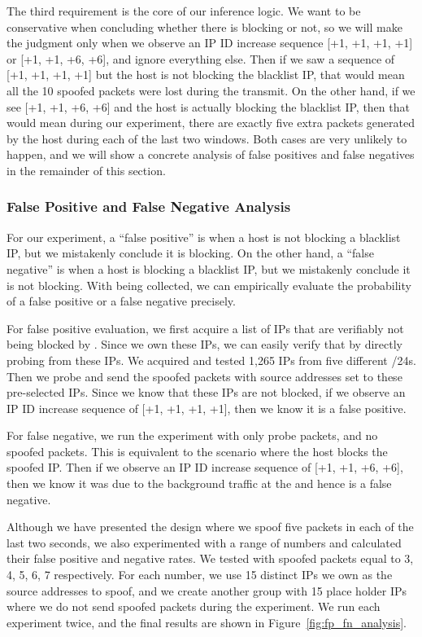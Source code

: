 The third requirement is the core of our inference logic. We want to be
conservative when concluding whether there is blocking or not, so we will
make the judgment only when we observe an IP ID increase sequence [+1, +1, +1,
+1] or [+1, +1, +6, +6], and ignore everything else. Then if we saw a
sequence of [+1, +1, +1, +1] but the host is not blocking the blacklist IP,
that would mean all the 10 spoofed packets were lost during the transmit. On
the other hand, if we see [+1, +1, +6, +6] and the host is actually blocking
the blacklist IP, then that would mean during our experiment, there are
exactly five extra packets generated by the host during each of the last two
windows. Both cases are very unlikely to happen, and we will show a concrete
analysis of false positives and false negatives in the remainder of this section.


\subsubsection{False Positive and False Negative Analysis}
\label{subsec:fpfn_analysis}
For our experiment, a ``false positive'' is when a host is not
blocking a blacklist IP, but we mistakenly conclude it is blocking. On the
other hand, a ``false negative'' is when a host is blocking a
blacklist IP, but we mistakenly conclude it is not blocking. With
{} being collected, we can empirically evaluate the
probability of a false positive or a false negative precisely.

For false positive evaluation, we first acquire a list of IPs that are verifiably
not being blocked by {}. Since we own these IPs, we can easily verify
that by directly probing {} from these IPs. We acquired and tested
1,265 IPs from five different /24s. Then we probe {} and send the
spoofed packets with source addresses set to these pre-selected IPs. Since we
know that these IPs are not blocked, if we observe an IP ID increase sequence of
[+1, +1, +1, +1], then we know it is a false positive.

For false negative, we run the experiment with only probe packets, and no
spoofed packets. This is equivalent to the scenario where the host blocks the
spoofed IP. Then if we observe an IP ID increase sequence of [+1, +1, +6,
+6], then we know it was due to the background traffic at the {}
and hence is a false negative.

Although we have presented the design where we spoof five packets
in each of the last two seconds, we also experimented with a range of
numbers and calculated their false positive and negative rates. We tested
with spoofed packets equal to 3, 4, 5, 6, 7 respectively. For each number,
we use 15 distinct IPs we own as the source addresses to spoof, and we
create another group with 15 place holder IPs where we do not send spoofed
packets during the experiment. We run each experiment twice, and the final
results are shown in Figure~\ref{fig:fp_fn_analysis}.

